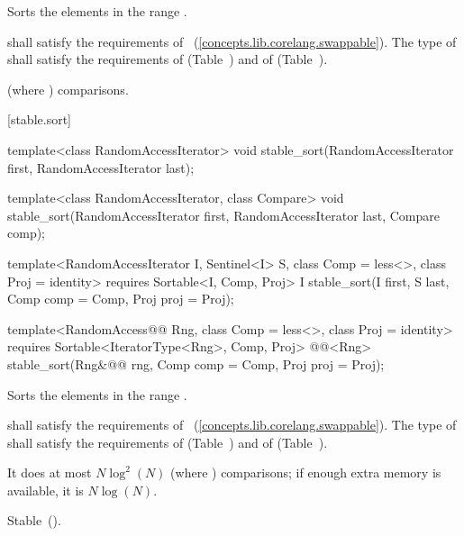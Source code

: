 \begin{itemdescr}
\pnum
\effects
Sorts the elements in the range
.

\begin{removedblock}
\pnum
\requires
{} shall satisfy the requirements of
~(\ref{concepts.lib.corelang.swappable}). The type
of  shall satisfy the requirements of
 (Table~) and of
 (Table~).
\end{removedblock}

\pnum
\complexity
{}
(where
)
comparisons.
\end{itemdescr}

[stable.sort]{}

%
\begin{removedblock}
\begin{itemdecl}
template<class RandomAccessIterator>
  void stable_sort(RandomAccessIterator first, RandomAccessIterator last);

template<class RandomAccessIterator, class Compare>
  void stable_sort(RandomAccessIterator first, RandomAccessIterator last,
                   Compare comp);
\end{itemdecl}
\end{removedblock}
\begin{addedblock}
\begin{itemdecl}
template<RandomAccessIterator I, Sentinel<I> S, class Comp = less<>,
    class Proj = identity>
  requires Sortable<I, Comp, Proj>
  I stable_sort(I first, S last, Comp comp = Comp{}, Proj proj = Proj{});

template<RandomAccess@@ Rng, class Comp = less<>, class Proj = identity>
  requires Sortable<IteratorType<Rng>, Comp, Proj>
  @@<Rng>
    stable_sort(Rng&@\newtxt{\&}@ rng, Comp comp = Comp{}, Proj proj = Proj{});
\end{itemdecl}
\end{addedblock}

\begin{itemdescr}
\pnum
\effects
Sorts the elements in the range .

\begin{removedblock}
\pnum
\requires
{} shall satisfy the requirements of
~(\ref{concepts.lib.corelang.swappable}). The type
of  shall satisfy the requirements of
 (Table~) and of
 (Table~).
\end{removedblock}

\pnum
\complexity
It does at most $N \log^2(N)$
(where
)
comparisons; if enough extra memory is available, it is
$N \log(N)$.

\pnum
\remarks Stable~().
\end{itemdescr}

